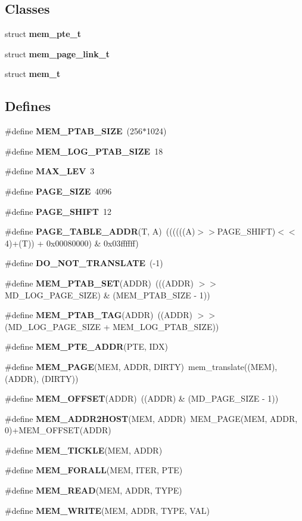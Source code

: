 \subsection*{Classes}
\begin{CompactItemize}
\item 
struct {\bf mem\_\-pte\_\-t}
\item 
struct {\bf mem\_\-page\_\-link\_\-t}
\item 
struct {\bf mem\_\-t}
\end{CompactItemize}
\subsection*{Defines}
\begin{CompactItemize}
\item 
\#define {\bf MEM\_\-PTAB\_\-SIZE}~(256$\ast$1024)
\item 
\#define {\bf MEM\_\-LOG\_\-PTAB\_\-SIZE}~18
\item 
\#define {\bf MAX\_\-LEV}~3
\item 
\#define {\bf PAGE\_\-SIZE}~4096
\item 
\#define {\bf PAGE\_\-SHIFT}~12
\item 
\#define {\bf PAGE\_\-TABLE\_\-ADDR}(T, A)~((((((A)$>$$>$PAGE\_\-SHIFT)$<$$<$4)+(T)) + 0x00080000) \& 0x03ffffff)
\item 
\#define {\bf DO\_\-NOT\_\-TRANSLATE}~(-1)
\item 
\#define {\bf MEM\_\-PTAB\_\-SET}(ADDR)~(((ADDR) $>$$>$ MD\_\-LOG\_\-PAGE\_\-SIZE) \& (MEM\_\-PTAB\_\-SIZE - 1))
\item 
\#define {\bf MEM\_\-PTAB\_\-TAG}(ADDR)~((ADDR) $>$$>$ (MD\_\-LOG\_\-PAGE\_\-SIZE + MEM\_\-LOG\_\-PTAB\_\-SIZE))
\item 
\#define {\bf MEM\_\-PTE\_\-ADDR}(PTE, IDX)
\item 
\#define {\bf MEM\_\-PAGE}(MEM, ADDR, DIRTY)~mem\_\-translate((MEM), (ADDR), (DIRTY))
\item 
\#define {\bf MEM\_\-OFFSET}(ADDR)~((ADDR) \& (MD\_\-PAGE\_\-SIZE - 1))
\item 
\#define {\bf MEM\_\-ADDR2HOST}(MEM, ADDR)~MEM\_\-PAGE(MEM, ADDR, 0)+MEM\_\-OFFSET(ADDR)
\item 
\#define {\bf MEM\_\-TICKLE}(MEM, ADDR)
\item 
\#define {\bf MEM\_\-FORALL}(MEM, ITER, PTE)
\item 
\#define {\bf MEM\_\-READ}(MEM, ADDR, TYPE)
\item 
\#define {\bf MEM\_\-WRITE}(MEM, ADDR, TYPE, VAL)

\end{CompactItemize}

